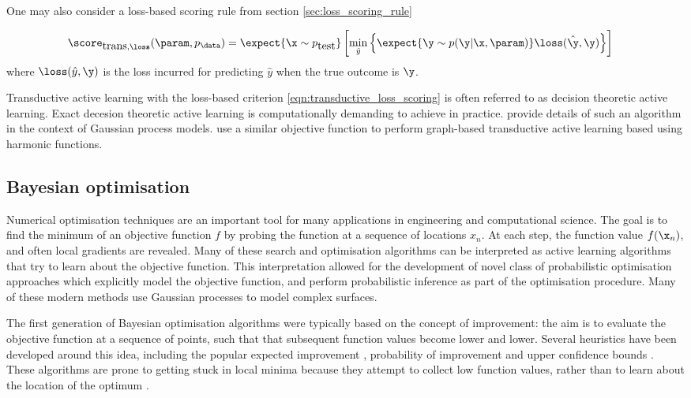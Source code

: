 One may also consider a loss-based scoring rule from section \ref{sec:loss_scoring_rule}

\begin{align}
	\score_{\mbox{trans},\loss}(\param,p_\data) &= \expect{\x\sim p_{\mbox{test}}}\left[ \min_{\hat{y}} \left\{\expect{\y\sim p(\y\vert\x,\param)} \loss(\hat{\y},\y) \right\} \right]\label{eqn:transductive_loss_scoring}
\end{align}
where $\loss(\hat{y},\y)$ is the loss incurred for predicting $\hat{y}$ when the true outcome is $\y$.

Transductive active learning with the loss-based criterion \eqref{eqn:transductive_loss_scoring} is often referred to as decision theoretic active learning. Exact decesion theoretic active learning is computationally demanding to achieve in practice. \citet{Kapoor2007} provide details of such an algorithm in the context of Gaussian process models. \citet{Zhu2003active} use a similar objective function to perform graph-based transductive active learning based using harmonic functions.

\subsection{Bayesian optimisation}

Numerical optimisation techniques are an important tool for many applications in engineering and computational science.
The goal is to find the minimum of an objective function $f$ by probing the function at a sequence of locations $x_n$. At each step, the function value $f(\x_n)$, and often local gradients are revealed. Many of these search and optimisation algorithms can be interpreted as active learning algorithms that try to learn about the objective function. This interpretation allowed for the development of novel class of probabilistic optimisation approaches which explicitly model the objective function, and perform probabilistic inference as part of the optimisation procedure. Many of these modern methods use Gaussian processes to model complex surfaces.

The first generation of Bayesian optimisation algorithms were typically based on the concept of improvement: the aim is to evaluate the objective function at a sequence of points, such that that subsequent function values become lower and lower. Several heuristics have been developed around this idea, including the popular expected improvement \citep{Mockus1982,Jones1998, Frean2008}, probability of improvement \citep{Jones2001,Lizotte2008} and upper confidence bounds \citep{Srinivas2009}. These algorithms are prone to getting stuck in local minima because they attempt to collect low function values, rather than to learn about the location of the optimum \citep{Hennig2012entropy}.

